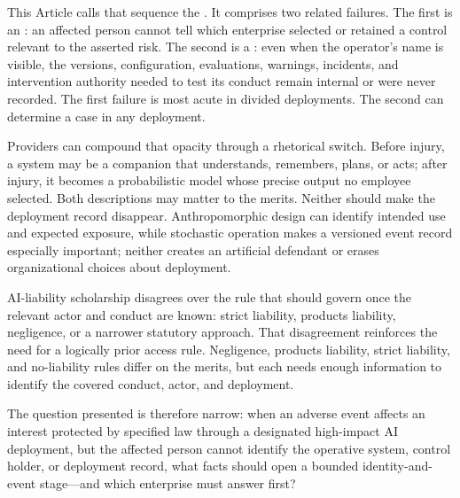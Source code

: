 This Article calls that sequence the . It comprises two related failures. The first is an : an affected person cannot tell which enterprise selected or retained a control relevant to the asserted risk. The second is a : even when the operator's name is visible, the versions, configuration, evaluations, warnings, incidents, and intervention authority needed to test its conduct remain internal or were never recorded. The first failure is most acute in divided deployments. The second can determine a case in any deployment.

Providers can compound that opacity through a rhetorical switch. Before injury, a system may be a companion that understands, remembers, plans, or acts; after injury, it becomes a probabilistic model whose precise output no employee selected. Both descriptions may matter to the merits. Neither should make the deployment record disappear. Anthropomorphic design can identify intended use and expected exposure, while stochastic operation makes a versioned event record especially important; neither creates an artificial defendant or erases organizational choices about deployment.

AI-liability scholarship disagrees over the rule that should govern once the relevant actor and conduct are known: strict liability, products liability, negligence, or a narrower statutory approach. That disagreement reinforces the need for a logically prior access rule. Negligence, products liability, strict liability, and no-liability rules differ on the merits, but each needs enough information to identify the covered conduct, actor, and deployment.

The question presented is therefore narrow: when an adverse event affects an interest protected by specified law through a designated high-impact AI deployment, but the affected person cannot identify the operative system, control holder, or deployment record, what facts should open a bounded identity-and-event stage---and which enterprise must answer first?


